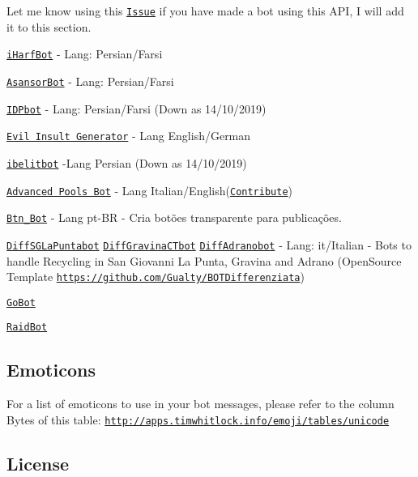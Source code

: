 Let me know using this \href{https://github.com/Eleirbag89/TelegramBotPHP/issues/80}{\tt Issue} if you have made a bot using this A\-P\-I, I will add it to this section.
\begin{DoxyItemize}
\item \href{https://t.me/iHarfBot}{\tt i\-Harf\-Bot} -\/ Lang\-: Persian/\-Farsi
\item \href{https://t.me/AsansorBot}{\tt Asansor\-Bot} -\/ Lang\-: Persian/\-Farsi
\item \href{https://t.me/IDPbot}{\tt I\-D\-Pbot} -\/ Lang\-: Persian/\-Farsi (Down as 14/10/2019)
\item \href{https://telegram.me/EvilInsultGeneratorBot}{\tt Evil Insult Generator} -\/ Lang English/\-German
\item \href{https://telegram.me/ibelitbot}{\tt ibelitbot} -\/\-Lang Persian (Down as 14/10/2019)
\item \href{https://telegram.me/apollbot}{\tt Advanced Pools Bot} -\/ Lang Italian/\-English(\href{https://poeditor.com/join/project/NMAUjrAZ5f}{\tt Contribute})
\item \href{https://telegram.me/Btn_Bot}{\tt Btn\-\_\-\-Bot} -\/ Lang pt-\/\-B\-R -\/ Cria botões transparente para publicações.
\item \href{https://telegram.me/DiffSGLaPuntabot}{\tt Diff\-S\-G\-La\-Puntabot} \href{https://telegram.me/DiffGravinaCTbot}{\tt Diff\-Gravina\-C\-Tbot} \href{https://t.me/DiffAdranobot}{\tt Diff\-Adranobot} -\/ Lang\-: it/\-Italian -\/ Bots to handle Recycling in San Giovanni La Punta, Gravina and Adrano (Open\-Source Template \href{https://github.com/Gualty/BOTDifferenziata}{\tt https\-://github.\-com/\-Gualty/\-B\-O\-T\-Differenziata})
\item \href{https://t.me/CoReYe_PGO_bot}{\tt Go\-Bot}
\item \href{https://t.me/CoReYe_PGO_Raid_bot}{\tt Raid\-Bot}
\end{DoxyItemize}

\subsection*{Emoticons }

For a list of emoticons to use in your bot messages, please refer to the column Bytes of this table\-: \href{http://apps.timwhitlock.info/emoji/tables/unicode}{\tt http\-://apps.\-timwhitlock.\-info/emoji/tables/unicode}

\subsection*{License }

